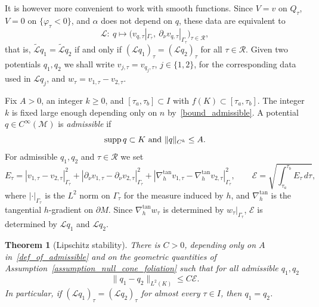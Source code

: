 \documentclass[12pt,reqno]{amsart}
\numberwithin{equation}{section}
\theoremstyle{definition}
\theoremstyle{plain}
\newtheorem{theorem}{Theorem}[section]
\theoremstyle{definition}
\theoremstyle{definition}
\newcommand{\M}{\mathcal{M}}
\newcommand{\uu}{M}
\DeclareMathOperator{\supp}{supp}
\begin{document}
It is however more convenient to work with smooth functions. Since $V=v$ on $Q_\tau$, $V=0$ on $\{\varphi_\tau<0\}$, and $\alpha$ does not depend on $q$, these data are equivalent to
\begin{equation}\label{eq_data_v}
\mathcal L:\ q\longmapsto\bigl(v_{q,\tau}|_{\Gamma_\tau},\ \partial_\nu v_{q,\tau}|_{\Gamma_\tau}\bigr)_{\tau\in\mathcal R},
\end{equation}
that is, $\tilde{\mathcal L}q_1=\tilde{\mathcal L}q_2$ if and only if $(\mathcal Lq_1)_\tau=(\mathcal Lq_2)_\tau$ for all $\tau\in\mathcal R$. Given two potentials $q_1,q_2$ we shall write $v_{j,\tau}=v_{q_j,\tau}$, $j \in \{1,2\}$, for the corresponding data used in $\mathcal{L}q_j$, and $w_\tau=v_{1,\tau}-v_{2,\tau}$.

Fix $A>0$, an integer $k\ge0$, and $[\tau_a,\tau_b]\subset I$ with $f(K)\subset[\tau_a,\tau_b]$. The integer $k$ is fixed large enough depending only on $n$ by~\eqref{bound_admissible}. A potential $q\in C^\infty(\M)$ is \textit{admissible} if
\begin{equation}
\label{def_of_admissible}
\supp q\subset K \textnormal{ and } \|q\|_{C^k}\le A.
\end{equation}
For admissible $q_1,q_2$ and $\tau\in\mathcal R$ we set
\begin{equation}\label{eq_data_E}
 E_\tau=|v_{1,\tau}-v_{2,\tau}|^2_{\Gamma_\tau}+|\partial_\nu v_{1,\tau}-\partial_\nu v_{2,\tau}|^2_{\Gamma_\tau}+|\nabla_h^{\tan} v_{1,\tau}-\nabla_h^{\tan}v_{2,\tau}|^2_{\Gamma_\tau},\qquad \mathcal E= \sqrt{\int_{\tau_a}^{\tau_b} E_\tau\,d\tau },
\end{equation}
where $|\cdot|_{\Gamma_\tau}$ is the $L^2$ norm on $\Gamma_\tau$ for the measure induced by $h$, and $\nabla_h^{\tan}$ is the tangential $h$-gradient on $\partial\uu$. Since $\nabla_h^{\tan}w_\tau$ is determined by $w_\tau|_{\Gamma_\tau}$, $\mathcal E$ is determined by $\mathcal Lq_1$ and $\mathcal Lq_2$.


\begin{theorem}[Lipschitz stability]\label{thm_main}
There is $C>0$, depending only on $A$ in~\eqref{def_of_admissible} and on the geometric quantities of Assumption~\ref{assumption_null_cone_foliation} such that for all admissible $q_1,q_2$
\[
\|q_1-q_2\|_{L^2(K)}\le C\mathcal E.
\]
In particular, if $(\mathcal Lq_1)_\tau=(\mathcal Lq_2)_\tau$ for almost every $\tau\in I$, then $q_1=q_2$.
\end{theorem}
\end{document}
